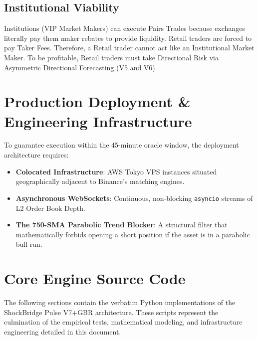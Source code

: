\documentclass[11pt,a4paper]{report}
\begin{document}
\section{Institutional Viability}
Institutions (VIP Market Makers) can execute Pairs Trades because exchanges literally pay them maker rebates to provide liquidity. Retail traders are forced to pay Taker Fees. Therefore, a Retail trader cannot act like an Institutional Market Maker. To be profitable, Retail traders must take Directional Risk via Asymmetric Directional Forecasting (V5 and V6).

\chapter{Production Deployment \& Engineering Infrastructure}
To guarantee execution within the 45-minute oracle window, the deployment architecture requires:
\begin{itemize}
\item \textbf{Colocated Infrastructure}: AWS Tokyo VPS instances situated geographically adjacent to Binance's matching engines.
\item \textbf{Asynchronous WebSockets}: Continuous, non-blocking \texttt{asyncio} streams of L2 Order Book Depth.
\item \textbf{The 750-SMA Parabolic Trend Blocker}: A structural filter that mathematically forbids opening a short position if the asset is in a parabolic bull run.
\end{itemize}

\appendix
\chapter{Core Engine Source Code}
The following sections contain the verbatim Python implementations of the ShockBridge Pulse V7+GBR architecture. These scripts represent the culmination of the empirical tests, mathematical modeling, and infrastructure engineering detailed in this document.
\end{document}
